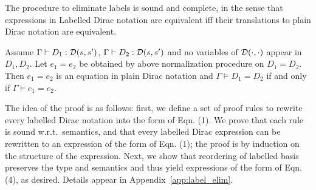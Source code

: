 The procedure to eliminate labels is sound and complete, in the sense
that expressions in Labelled Dirac notation are equivalent iff their
translations to plain Dirac notation are equivalent.
\begin{theorem}
  \label{thm: normalization}
  Assume $\Gamma\vdash D_1 : {\mathcal{D}}(s,s')$, $\Gamma\vdash D_2 :
  {\mathcal{D}}(s,s')$ and no variables of $\mathcal{D}(\cdot,\cdot)$ appear in
  $D_1,D_2$.  Let $e_1 = e_2$ be obtained by above normalization
  procedure on $D_1 = D_2$.  Then $e_1=e_2$ is an equation in plain
  Dirac notation and $\Gamma\vDash D_1 = D_2$ if and only if
  $\Gamma\vDash e_1 = e_2$.
\end{theorem}
The idea of the proof is as follows: first, we define a set of proof
rules to rewrite every labelled Dirac notation into the form of
Eqn. (1). We prove that each rule is sound w.r.t.\, semantics, and
that every labelled Dirac expression can be rewritten to an expression
of the form of Eqn. (1); the proof is by induction on the structure of
the expression. Next, we show that reordering of labelled basis
preserves the type and semantics and thus yield expressions of the
form of Eqn. (4), as desired. Details appear in
Appendix~\ref{app:label_elim}.
  




